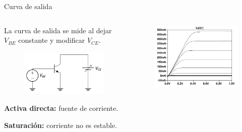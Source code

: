 \documentclass[t,aspectratio=169]{beamer}
\begin{document}
\begin{frame}{Curva de salida}

\begin{columns}
\begin{column}{0.5\textwidth}

La curva de salida se mide al dejar $V_{BE}$ constante y modificar $V_{CE}$.

\begin{figure}
    \centering
    \includegraphics[width=\textwidth]{figures/curva_salida_1.png}
\end{figure}
%
\textbf{Activa directa:} fuente de corriente.

\textbf{Saturación:} corriente no es estable.


\end{column}
\begin{column}{0.5\textwidth}

\begin{figure}
    \centering
    \includegraphics[width=\textwidth]{figures/curva_salida_2.png}
\end{figure}

\end{column}
\end{columns}

\end{frame}
\end{document}
